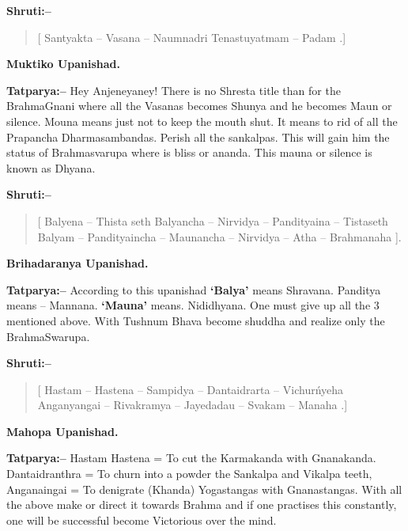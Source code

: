 \textbf{Shruti:–}

\begin{verse}
[ Santyakta – Vasana – Naumnadri Tenastuyatmam – Padam .]
\end{verse}

\begin{flushright}
\textbf{Muktiko Upanishad.}
\end{flushright}

\textbf{Tatparya:–} Hey Anjeneyaney! There is no Shresta title than for the BrahmaGnani where all the Vasanas becomes Shunya and he becomes Maun or silence. Mouna means just not to keep the mouth shut. It means to rid of all the Prapancha Dharmasambandas. Perish all the sankalpas. This will gain him the status of Brahmasvarupa where is bliss or ananda. This mauna or silence is known as Dhyana.

\textbf{Shruti:–}

\begin{verse}
[ Balyena – Thista seth  Balyancha – Nirvidya – Pandityaina – Tistaseth  Balyam – Pandityaincha – Maunancha – Nirvidya – Atha – Brahmanaha ].
\end{verse}

\begin{flushright}
\textbf{Brihadaranya Upanishad.}
\end{flushright}

\textbf{Tatparya:–} According to this upanishad \textbf{‘Balya’} means Shravana. Panditya means – Mannana. \textbf{‘Mauna’} means. Nididhyana. One must give up all the 3 mentioned above. With Tushnum Bhava become shuddha and realize only the BrahmaSwarupa.

\textbf{Shruti:–}

\begin{verse}
[ Hastam – Hastena – Sampidya – Dantaidrarta – Vichurńyeha  Anganyangai – Rivakramya – Jayedadau – Svakam – Manaha .]
\end{verse}

\begin{flushright}
\textbf{Mahopa Upanishad.}
\end{flushright}

\textbf{Tatparya:–} Hastam Hastena = To cut the Karmakanda with Gnanakanda. Dantaidranthra = To churn into a powder the Sankalpa and Vikalpa teeth, Anganaingai = To denigrate (Khanda) Yogastangas with Gnanastangas. With all the above make or direct it towards Brahma and if one practises this constantly, one will be successful become Victorious over the mind.

